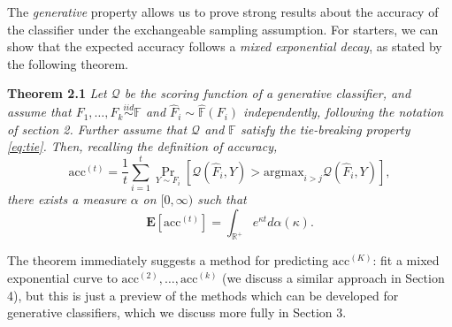 \documentclass{article}
\newcommand{\E}{\textbf{E}}
\newcommand{\argmax}{\text{argmax}}
\begin{document}
The \emph{generative} property allows us to prove strong results about the accuracy of the classifier
under the exchangeable sampling assumption.  For starters, we can show that the
expected accuracy follows a \emph{mixed exponential decay}, as stated by the following theorem.

\noindent\textbf{Theorem 2.1}
\emph{
Let $\mathcal{Q}$ be the scoring function of a generative classifier, and 
assume that $F_1,\hdots, F_k \stackrel{iid}{\sim} \mathbb{F}$ and $\hat{F}_i \sim \hat{\mathbb{F}}(F_i)$ independently,
following the notation of section 2.
Further assume that $\mathcal{Q}$ and $\mathbb{F}$ satisfy the tie-breaking property \eqref{eq:tie}.
Then, recalling the definition of accuracy,
\[
\text{acc}^{(t)} = \frac{1}{t}\sum_{i=1}^t \Pr_{Y \sim F_i}[\mathcal{Q}(\hat{F}_i, Y) > \argmax_{i > j} \mathcal{Q}(\hat{F}_i, Y)],
\]
there exists a measure $\alpha$ on $[0, \infty)$ such that
\[
\E[\text{acc}^{(t)}] = \int_{\mathbb{R}^{+}} e^{\kappa t} d\alpha(\kappa).
\]
}

The theorem immediately suggests a method for predicting $\text{acc}^{(K)}$:
fit a mixed exponential curve to $\text{acc}^{(2)},\hdots, \text{acc}^{(k)}$
(we discuss a similar approach in Section 4),
but this is just a preview of the methods which can be developed for generative classifiers,
which we discuss more fully in Section 3.
\end{document}
